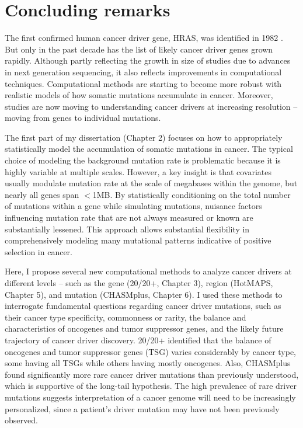 
\chapter{Concluding remarks}
\label{chap:ch8}

The first confirmed human cancer driver gene, HRAS, was identified in 1982 \cite{RN21, RN19}. But only in the past decade has the list of likely cancer driver genes grown rapidly. Although partly reflecting the growth in size of studies due to advances in next generation sequencing, it also reflects improvements in computational techniques. Computational methods are starting to become more robust with realistic models of how somatic mutations accumulate in cancer. Moreover, studies are now moving to understanding cancer drivers at increasing resolution -- moving from genes to individual mutations.

The first part of my dissertation (Chapter 2) focuses on how to appropriately statistically model the accumulation of somatic mutations in cancer. The typical choice of modeling the background mutation rate is problematic because it is highly variable at multiple scales. However, a key insight is that covariates usually modulate mutation rate at the scale of megabases within the genome, but nearly all genes span $<$1MB. By statistically conditioning on the total number of mutations within a gene while simulating mutations, nuisance factors influencing mutation rate that are not always measured or known are substantially lessened. This approach allows substantial flexibility in comprehensively modeling many mutational patterns indicative of positive selection in cancer.

Here, I propose several new computational methods to analyze cancer drivers at different levels -- such as the gene (20/20+, Chapter 3), region (HotMAPS, Chapter 5), and mutation (CHASMplus, Chapter 6). I used these methods to interrogate fundamental questions regarding cancer driver mutations, such as their cancer type specificity, commonness or rarity, the balance and characteristics of oncogenes and tumor suppressor genes, and the likely future trajectory of cancer driver discovery. 20/20+ identified that the balance of oncogenes and tumor suppressor genes (TSG) varies considerably by cancer type, some having all TSGs while others having mostly oncogenes. Also, CHASMplus found significantly more rare cancer driver mutations than previously understood, which is supportive of the long-tail hypothesis. The high prevalence of rare driver mutations suggests interpretation of a cancer genome will need to be increasingly personalized, since a patient’s driver mutation may have not been previously observed. 

